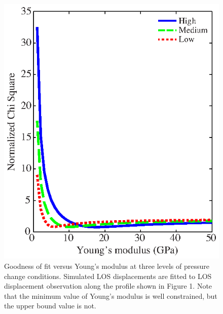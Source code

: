 \clearpage
\begin{figure}
	\centering
	\includegraphics{figs_paper3/Fig9.eps}	
	\caption{Goodness of fit versus Young’s modulus at three levels of pressure change conditions.  Simulated LOS displacements are fitted to LOS displacement observation along the profile shown in Figure 1.  Note that the minimum value of Young’s modulus is well constrained, but the upper bound value is not.  }
	\label{fig:goodness}
\end{figure}


